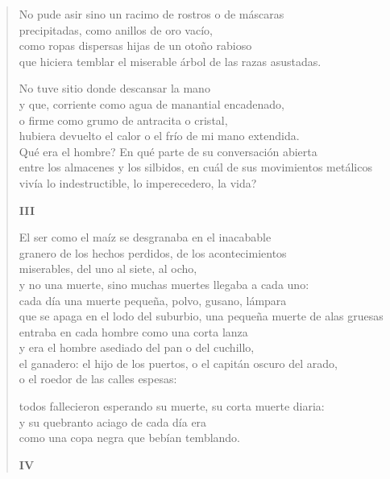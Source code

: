 \documentclass[12pt]{article}
\begin{document}
\begin{verse}
No pude asir sino un racimo de rostros o de máscaras\\
precipitadas, como anillos de oro vacío,\\
como ropas dispersas hijas de un otoño rabioso\\
que hiciera temblar el miserable árbol de las razas asustadas.  

No tuve sitio donde descansar la mano\\
y que, corriente como agua de manantial encadenado,\\
o firme como grumo de antracita o cristal,\\
hubiera devuelto el calor o el frío de mi mano extendida.\\
Qué era el hombre? En qué parte de su conversación abierta\\
entre los almacenes y los silbidos, en cuál de sus movimientos metálicos\\
vivía lo indestructible, lo imperecedero, la vida?  

{\bfseries\scshape {III}}

El ser como el maíz se desgranaba en el inacabable\\
granero de los hechos perdidos, de los acontecimientos\\
miserables, del uno al siete, al ocho,\\
y no una muerte, sino muchas muertes llegaba a cada uno:\\
cada día una muerte pequeña, polvo, gusano, lámpara\\
que se apaga en el lodo del suburbio, una pequeña muerte de alas gruesas\\
entraba en cada hombre como una corta lanza\\
y era el hombre asediado del pan o del cuchillo,\\
el ganadero: el hijo de los puertos, o el capitán oscuro del arado,\\
o el roedor de las calles espesas:  

todos fallecieron esperando su muerte, su corta muerte diaria:\\
y su quebranto aciago de cada día era\\
como una copa negra que bebían temblando.  

{\bfseries\scshape {IV}}


\end{verse}
\end{document}
